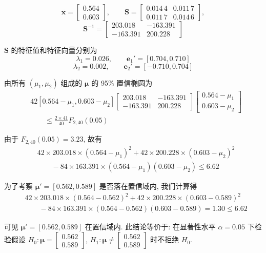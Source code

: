 \[
\bar{\mathbf{x}}=\begin{bmatrix}0.564\\0.603\end{bmatrix},\qquad \mathbf{S}=\begin{bmatrix}0.014\,4 & 0.011\,7\\0.011\,7 & 0.014\,6\end{bmatrix},
\]
\[
\mathbf{S}^{-1}=\begin{bmatrix}203.018 & -163.391\\-163.391 & 200.228\end{bmatrix}
\]

$\mathbf{S}$ 的特征值和特征向量分别为
\[
\lambda_1=0.026,\qquad \mathbf{e}_1'=[0.704,0.710]
\]
\[
\lambda_2=0.002,\qquad \mathbf{e}_2'=[-0.710,0.704]
\]

由所有 $(\mu_1,\mu_2)$ 组成的 $\boldsymbol{\mu}$ 的 95\% 置信椭圆为
\begin{align*}
&42[0.564-\mu_1,0.603-\mu_2]\begin{bmatrix}203.018&-163.391\\-163.391&200.228\end{bmatrix}\begin{bmatrix}0.564-\mu_1\\0.603-\mu_2\end{bmatrix}\\
&\qquad\leqslant\frac{2\times 41}{40}F_{2,40}(0.05)
\end{align*}

由于 $F_{2,40}(0.05)=3.23$, 故有
\begin{align*}
&42\times 203.018\times(0.564-\mu_1)^2+42\times 200.228\times(0.603-\mu_2)^2\\
&\qquad-84\times 163.391\times(0.564-\mu_1)(0.603-\mu_2)\leqslant 6.62
\end{align*}

为了考察 $\boldsymbol{\mu}'=[0.562,0.589]$ 是否落在置信域内, 我们计算得
\begin{align*}
&42\times 203.018\times(0.564-0.562)^2+42\times 200.228\times(0.603-0.589)^2\\
&\qquad-84\times 163.391\times(0.564-0.562)(0.603-0.589)=1.30\leqslant 6.62
\end{align*}

可见 $\boldsymbol{\mu}'=[0.562,0.589]$ 在置信域内. 此结论等价于: 在显著性水平 $\alpha=0.05$ 下检验假设 $H_0: \boldsymbol{\mu}=\begin{bmatrix}0.562\\0.589\end{bmatrix}$, $H_1: \boldsymbol{\mu}\neq\begin{bmatrix}0.562\\0.589\end{bmatrix}$ 时不拒绝 $H_0$.


